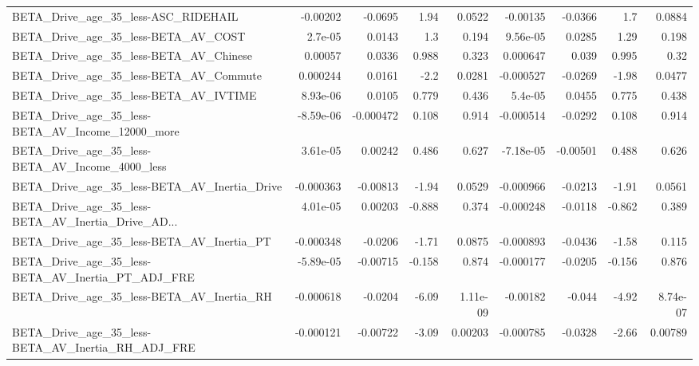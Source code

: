 \begin{tabular}{lrrrrrrrr}
BETA\_Drive\_age\_35\_less-ASC\_RIDEHAIL                &    -0.00202 &      -0.0695 &     1.94 &   0.0522 &   -0.00135 &     -0.0366 &          1.7 &        0.0884 \\
BETA\_Drive\_age\_35\_less-BETA\_AV\_COST                &     2.7e-05 &       0.0143 &      1.3 &    0.194 &   9.56e-05 &      0.0285 &         1.29 &         0.198 \\
BETA\_Drive\_age\_35\_less-BETA\_AV\_Chinese             &     0.00057 &       0.0336 &    0.988 &    0.323 &   0.000647 &       0.039 &        0.995 &          0.32 \\
BETA\_Drive\_age\_35\_less-BETA\_AV\_Commute             &    0.000244 &       0.0161 &     -2.2 &   0.0281 &  -0.000527 &     -0.0269 &        -1.98 &        0.0477 \\
BETA\_Drive\_age\_35\_less-BETA\_AV\_IVTIME              &    8.93e-06 &       0.0105 &    0.779 &    0.436 &    5.4e-05 &      0.0455 &        0.775 &         0.438 \\
BETA\_Drive\_age\_35\_less-BETA\_AV\_Income\_12000\_more   &   -8.59e-06 &    -0.000472 &    0.108 &    0.914 &  -0.000514 &     -0.0292 &        0.108 &         0.914 \\
BETA\_Drive\_age\_35\_less-BETA\_AV\_Income\_4000\_less    &    3.61e-05 &      0.00242 &    0.486 &    0.627 &  -7.18e-05 &    -0.00501 &        0.488 &         0.626 \\
BETA\_Drive\_age\_35\_less-BETA\_AV\_Inertia\_Drive       &   -0.000363 &     -0.00813 &    -1.94 &   0.0529 &  -0.000966 &     -0.0213 &        -1.91 &        0.0561 \\
BETA\_Drive\_age\_35\_less-BETA\_AV\_Inertia\_Drive\_AD... &    4.01e-05 &      0.00203 &   -0.888 &    0.374 &  -0.000248 &     -0.0118 &       -0.862 &         0.389 \\
BETA\_Drive\_age\_35\_less-BETA\_AV\_Inertia\_PT          &   -0.000348 &      -0.0206 &    -1.71 &   0.0875 &  -0.000893 &     -0.0436 &        -1.58 &         0.115 \\
BETA\_Drive\_age\_35\_less-BETA\_AV\_Inertia\_PT\_ADJ\_FRE  &   -5.89e-05 &     -0.00715 &   -0.158 &    0.874 &  -0.000177 &     -0.0205 &       -0.156 &         0.876 \\
BETA\_Drive\_age\_35\_less-BETA\_AV\_Inertia\_RH          &   -0.000618 &      -0.0204 &    -6.09 & 1.11e-09 &   -0.00182 &      -0.044 &        -4.92 &      8.74e-07 \\
BETA\_Drive\_age\_35\_less-BETA\_AV\_Inertia\_RH\_ADJ\_FRE  &   -0.000121 &     -0.00722 &    -3.09 &  0.00203 &  -0.000785 &     -0.0328 &        -2.66 &       0.00789 \\

\end{tabular}
